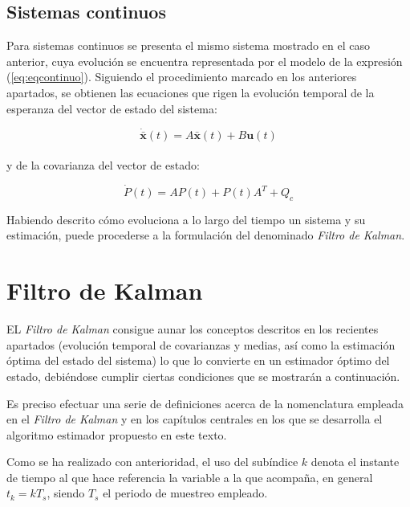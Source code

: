 \subsection{Sistemas continuos}

Para sistemas continuos se presenta el mismo sistema mostrado en el caso anterior, cuya evolución se encuentra representada por el modelo de la expresión (\ref{eq:eqcontinuo}). Siguiendo el procedimiento marcado en los anteriores apartados, se obtienen las ecuaciones que rigen la evolución temporal de la esperanza del vector de estado del sistema:

\begin{equation}
	\boldsymbol{\dot{\bar{x}}}(t) = A\boldsymbol{\bar{x}}(t) + B\boldsymbol{u}(t)
\end{equation} \\
\noindent
y de la covarianza del vector de estado: 

\begin{equation}
	\dot{P}(t) = AP(t) + P(t)A^T + Q_c
\end{equation}

Habiendo descrito cómo evoluciona a lo largo del tiempo un sistema y su estimación, puede procederse a la formulación del denominado \emph{Filtro de Kalman}. \par 

\section{Filtro de Kalman}

EL \emph{Filtro de Kalman} consigue aunar los conceptos descritos en los recientes apartados (evolución temporal de covarianzas y medias, así como la estimación óptima del estado del sistema) lo que lo convierte en un estimador óptimo del estado, debiéndose cumplir ciertas condiciones que se mostrarán a continuación. \par 

Es preciso efectuar una serie de definiciones acerca de la nomenclatura empleada en el \emph{Filtro de Kalman} y en los capítulos centrales en los que se desarrolla el algoritmo estimador propuesto en este texto. \par 

Como se ha realizado con anterioridad, el uso del subíndice $k$ denota el instante de tiempo al que hace referencia la variable a la que acompaña, en general $t_k = k T_s$, siendo $T_s$ el periodo de muestreo empleado. \par 

